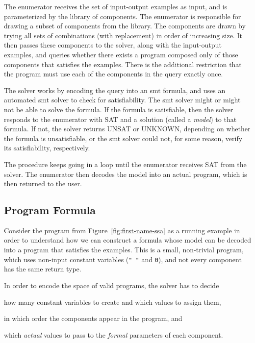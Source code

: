 The enumerator receives the set of input-output examples as input, and is
parameterized by the library of components. The enumerator is responsible for
drawing a subset of components from the library. The components are drawn by
trying all sets of combinations (with replacement) in order of increasing size.
It then passes these components to the solver, along with the input-output
examples, and queries whether there exists a program composed only of those
components that satisfies the examples. There is the additional restriction that
the program must use each of the components in the query exactly once.

The solver works by encoding the query into an \gls{smt} formula, and uses an
automated \gls{smt} solver to check for satisfiability. The \gls{smt} solver
might or might not be able to solve the formula. If the formula is satisfiable,
then the solver responds to the enumerator with SAT and a solution (called a
\textit{model}) to that formula. If not, the solver returns UNSAT or UNKNOWN,
depending on whether the formula is unsatisfiable, or the \gls{smt} solver could
not, for some reason, verify its satisfiability, respectively.

The procedure keeps going in a loop until the enumerator receives SAT from the
solver. The enumerator then decodes the model into an actual program, which is
then returned to the user.

\subsection{Program Formula}
\label{sec:program-formula}

Consider the program from Figure~\ref{fig:first-name-ssa} as a running
example in order to understand how we can construct a formula whose model can be
decoded into a program that satisfies the examples. This is a small, non-trivial
program, which uses non-input constant variables (\lstinline{" "} and
\lstinline{0}), and not every component has the same return type.

In order to encode the space of valid programs, the solver has to decide
\begin{enumerate*}[(1)]
\item how many constant variables to create and which values to assign them,
\item in which order the components appear in the program, and
\item which \textit{actual} values to pass to the \textit{formal} parameters of
  each component.
\end{enumerate*}

